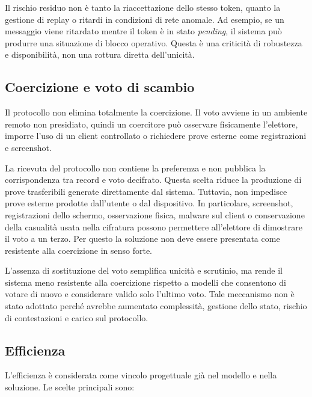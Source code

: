 \documentclass[a4paper,12pt]{article}
\begin{document}
Il rischio residuo non è tanto la riaccettazione dello stesso token, quanto la gestione di replay o ritardi in condizioni di rete anomale.
Ad esempio, se un messaggio viene ritardato mentre il token è in stato \emph{pending}, il sistema può produrre una situazione di blocco operativo.
Questa è una criticità di robustezza e disponibilità, non una rottura diretta dell'unicità.

\subsection{Coercizione e voto di scambio}

Il protocollo non elimina totalmente la coercizione.
Il voto avviene in un ambiente remoto non presidiato, quindi un coercitore può osservare fisicamente l'elettore, imporre l'uso di un client controllato o richiedere prove esterne come registrazioni e screenshot.

La ricevuta del protocollo non contiene la preferenza e non pubblica la corrispondenza tra record e voto decifrato. Questa scelta riduce la produzione di prove trasferibili generate direttamente dal sistema.
Tuttavia, non impedisce prove esterne prodotte dall'utente o dal dispositivo. In particolare, screenshot, registrazioni dello schermo, osservazione fisica, malware sul client o conservazione della casualità usata nella cifratura possono permettere all'elettore di dimostrare il voto a un terzo. Per questo la soluzione non deve essere presentata come resistente alla coercizione in senso forte.

L'assenza di sostituzione del voto semplifica unicità e scrutinio, ma rende il sistema meno resistente alla coercizione rispetto a modelli che consentono di votare di nuovo e considerare valido solo l'ultimo voto.
Tale meccanismo non è stato adottato perché avrebbe aumentato complessità, gestione dello stato, rischio di contestazioni e carico sul protocollo.

\subsection{Efficienza}

L'efficienza è considerata come vincolo progettuale già nel modello e nella soluzione.
Le scelte principali sono:
\end{document}
